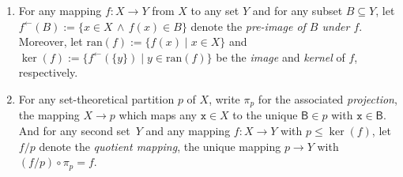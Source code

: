 \documentclass[10pt,a4paper]{amsart}
\numberwithin{equation}{section}
\newcommand{\Sand}{\,\wedge\,}
\newcommand{\classpredicate}{\mid}
\newcommand{\Scomposition}{\circ}
\newcommand{\fromto}[2]{#1 \to #2}
\newcommand{\xfromto}[3]{#1 \colon  #2 \to #3}
\newcommand{\sranx}[1]{\mathrm{ran}(#1)}
\newcommand{\spimgx}[2]{#1^{\leftarrow}(#2)}
\newcommand{\finerthan}{\mathrel{\leq}}
\newcommand{\finerthanrel}{\mathop{\leq}}
\newcommand{\Yp}[1]{\mathtt{#1}}
\newcommand{\Yb}[1]{\mathsf{#1}}
\newcommand{\blofun}[1]{\pi_{#1}}
\newcommand{\kerp}[1]{\ker(#1)}
\newcommand{\tsquomap}[2]{#1 / #2}
\begin{document}
\begin{Notation}
\begin{enumerate}
    {
      \newcommand{\smallpart}{p}
      \newcommand{\largepart}{q}
      \newcommand{\smallblock}{\Yb{B}}
      \newcommand{\largeblock}{\Yb{C}}
      \newcommand{\leftpartition}{p_1}
      \newcommand{\rightpartition}{p_2}
      \newcommand{\thejoin}{s}
      \newcommand{\thepartition}{p}
      \newcommand{\anyel}{\Yp{x}}
      \newcommand{\block}{\Yb{B}}
      Furthermore, for any set-theo\-re\-ti\-cal partitions $\leftpartition$ and $\rightpartition$ of $\theset$ the \emph{join} of $\leftpartition$ and $\rightpartition$ is the unique  set-theo\-re\-ti\-cal partition $\thejoin$ of $\theset$ which satisfies $\leftpartition\finerthan\thejoin$ and $\rightpartition\finerthan\thejoin$ and which is minimal with that property with respect to the partial order $\finerthanrel$.
    }
    \item\label{notation:set-theoretical-partitions-5}
    {
      \newcommand{\themap}{f}
      \newcommand{\domset}{X}
      \newcommand{\codset}{Y}
      \newcommand{\domsubset}{A}
      \newcommand{\codsubset}{B}
      \newcommand{\domel}{x}
      \newcommand{\codel}{y}
      For any mapping $\xfromto{\themap}{\domset}{\codset}$ from $\domset$ to any set $\codset$ and for any subset $\codsubset\subseteq \codset$, let $\spimgx{\themap}{\codsubset}:= \{\domel\in\domset\Sand \themap(\domel)\in\codsubset\}$ denote the \emph{pre-image of $\codsubset$ under $\themap$}. Moreover, let $\sranx{\themap}:= \{\themap(\domel)\classpredicate \domel\in\domset\}$ and $\kerp{\themap}:= \{\spimgx{\themap}{\{\codel\}}\classpredicate \codel\in\sranx{\themap}\}$ be the \emph{image} and \emph{kernel} of $\themap$, respectively.
    }
  \item\label{notation:set-theoretical-partitions-6}
    {
      \newcommand{\themap}{f}
      \newcommand{\domset}{X}
      \newcommand{\codset}{Y}
      \newcommand{\anyel}{\Yp{x}}
      \newcommand{\thepartition}{p}
      \newcommand{\block}{\Yb{B}}
      For any set-theo\-re\-ti\-cal partition  $\thepartition$ of $\domset$, write $\blofun{\thepartition}$ for the associated \emph{projection}, the mapping $\fromto{\domset}{\thepartition}$ which maps any  $\anyel\in\domset$ to the unique $\block\in\thepartition$ with $\anyel\in\block$. And for any second set~$\codset$ and any mapping $\xfromto{\themap}{\domset}{\codset}$ with $\thepartition\finerthan\kerp{\themap}$, let $\tsquomap{\themap}{\thepartition}$ denote the \emph{quotient mapping}, the unique mapping $\fromto{\thepartition}{\codset}$ with $(\tsquomap{\themap}{\thepartition})\Scomposition \blofun{\thepartition}=\themap$.
    }
  \end{enumerate}
\end{Notation}
\end{document}
